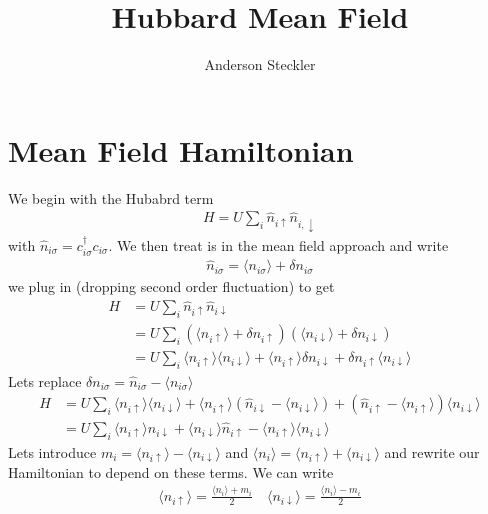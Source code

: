 \documentclass[11pt]{article}
\title{Hubbard Mean Field}
\author{Anderson Steckler}
\date{}
\begin{document}
\maketitle
\section{Mean Field Hamiltonian}
\noindent
We begin with the Hubabrd term
\begin{gather}
    H = U\sum_i \hat n_{i\uparrow}\hat n_{i, \downarrow}
\end{gather}
with $\hat n_{i\sigma}=c_{i\sigma}^\dagger c_{i\sigma}$. We then treat is in the mean field approach and write
\begin{gather}
    \hat n_{i\sigma} = \langle n_{i\sigma}\rangle + \delta n_{i\sigma}
\end{gather}
we plug in (dropping second order fluctuation) to get
\begin{align}
    H &= U\sum_i\hat n_{i\uparrow}\hat n_{i \downarrow} \\\nonumber
    &= U\sum_i\left(\langle n_{i\uparrow} \rangle+\delta n_{i\uparrow}\right)\left(\langle n_{i\downarrow} \rangle+\delta n_{i\downarrow}\right) \\\nonumber
    &= U\sum_i \langle n_{i\uparrow}\rangle\langle n_{i\downarrow}\rangle + \langle n_{i\uparrow}\rangle\delta n_{i\downarrow} + \delta n_{i\uparrow}\langle n_{i\downarrow}\rangle
\end{align}
Lets replace $\delta n_{i\sigma}=\hat n_{i\sigma} - \langle n_{i\sigma}\rangle$
\begin{align}
    H&=U\sum_i \langle n_{i\uparrow}\rangle\langle n_{i\downarrow}\rangle + \langle n_{i\uparrow}\rangle(\hat n_{i\downarrow} - \langle n_{i\downarrow}\rangle) + (\hat n_{i\uparrow} - \langle n_{i\uparrow}\rangle)\langle n_{i\downarrow}\rangle \\\nonumber
    &= U \sum_i \langle n_{i\uparrow}\rangle \hat n_{i\downarrow} + \langle n_{i\downarrow}\rangle \hat n_{i\uparrow} - \langle n_{i\uparrow}\rangle \langle n_{i\downarrow}\rangle
\end{align}
Lets introduce $m_i = \langle n_{i\uparrow}\rangle - \langle n_{i\downarrow}\rangle$ and $\langle n_i\rangle = \langle n_{i\uparrow} \rangle + \langle n_{i\downarrow}\rangle$ and rewrite our Hamiltonian to depend on these terms. We can write
\begin{gather}
    \langle n_{i\uparrow}\rangle = \frac{\langle n_i \rangle + m_i}{2} \quad \langle n_{i\downarrow}\rangle = \frac{\langle n_i\rangle -m_i}{2}
\end{gather}
\end{document}
